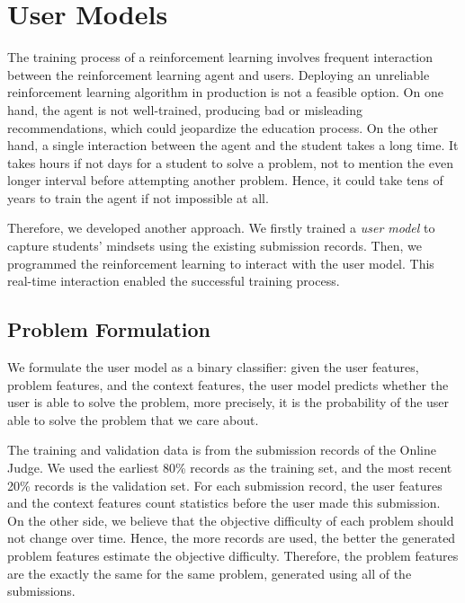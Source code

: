 
\chapter{User Models}

    The training process of a reinforcement learning involves frequent interaction
    between the reinforcement learning agent and users.
    Deploying an unreliable reinforcement learning algorithm in production is not a feasible option.
    On one hand, the agent is not well-trained, producing bad or misleading recommendations,
    which could jeopardize the education process.
    On the other hand, a single interaction between the agent and the student takes a long time.
    It takes hours if not days for a student to solve a problem,
    not to mention the even longer interval before attempting another problem.
    Hence, it could take tens of years to train the agent if not impossible at all.

    Therefore, we developed another approach.
    We firstly trained a \emph{user model} to capture students' mindsets using the existing submission records.
    Then, we programmed the reinforcement learning to interact with the user model.
    This real-time interaction enabled the successful training process.

\section{Problem Formulation}

    We formulate the user model as a binary classifier:
    given the user features, problem features, and the context features,
    the user model predicts whether the user is able to solve the problem,
    more precisely,
    it is the probability of the user able to solve the problem that we care about.

    The training and validation data is from the submission records of the Online Judge.
    We used the earliest 80\% records as the training set,
    and the most recent 20\% records is the validation set.
    For each submission record, the user features and the context features
    count statistics before the user made this submission.
    On the other side, we believe that the objective difficulty of each problem should not change over time.
    Hence, the more records are used, the better the generated problem features estimate the objective difficulty.
    Therefore, the problem features are the exactly the same for the same problem,
    generated using all of the submissions.

